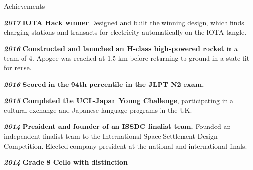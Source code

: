 \documentclass[10pt]{resume} %
\begin{document}




\begin{rSection}{Achievements}
    \item \textbf{\textit{2017} IOTA Hack winner} Designed and built the winning design, which finds charging stations and transacts for electricity automatically on the IOTA tangle.
    \item \textbf{\textit{2016} Constructed and launched an H-class high-powered rocket} in a team of 4. Apogee was reached at 1.5 km before returning to ground in a state fit for reuse.
    \item \textbf{\textit{2016} Scored in the 94th percentile in the JLPT N2 exam.}
    \item \textbf{\textit{2015} Completed the UCL-Japan Young Challenge}, participating in a cultural exchange and Japanese language programs in the UK.
    \item \textbf{\textit{2014} President and founder of an ISSDC finalist team.} Founded an independent finalist team to the International Space Settlement Design Competition. Elected company president at the national and international finals.
    \item \textbf{\textit{2014} Grade 8 Cello with distinction}
\end{rSection}
\end{document}

